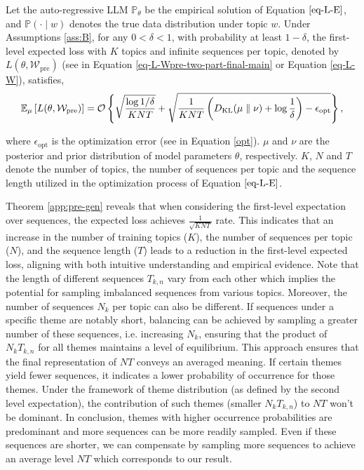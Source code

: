 \begin{theorem} Let the auto-regressive LLM $\mathbb{P}_\theta$ be the empirical solution of Equation $\ref{eq-L-E}$, and $\mathbb{P}(\cdot\mid w)$ denotes the true data distribution under topic $w$. Under Assumptions \ref{ass:B}, for any $0<\delta < 1$, with probability at least $1-\delta$, the first-level expected loss with $K$ topics and infinite sequences per topic, denoted by $L(\theta, \mathcal{W}_{\text{pre}})$ (see in Equation \ref{eq-L-Wpre-two-part-final-main} or Equation \ref{eq-L-W}), satisfies,
	\label{app:pre-gen}
    \begin{align*}
        \mathbb{E}_{\mu}\left[L(\theta, \mathcal{W}_{\text{pre}})\right]
        =\mathcal{O}\left\{\sqrt{\frac{\log 1/\delta}{KNT}}+\sqrt{\frac{1}{KNT}\left(D_{\mathrm{KL}}(\mu\parallel \nu)+\operatorname{log}\frac{1}{\delta}\right)-\epsilon_{\text{opt}}}\right\},
    \end{align*}

	where $\epsilon_{\text{opt}}$ is the optimization error (see in Equation \ref{opt}). $\mu$ and $\nu$ are the posterior and prior distribution of model parameters $\theta$, respectively. $K$, $N$ and $T$ denote the number of topics, the number of sequences per topic and the sequence length utilized in the optimization process of Equation $\ref{eq-L-E}$.
\end{theorem}

\begin{remark}\label{remark-app: the1}
	Theorem \ref{app:pre-gen} reveals that when considering the first-level expectation over sequences, the expected loss achieves $\frac{1}{\sqrt{KNT}}$ rate. This indicates that an increase in the number of training topics ($K$), the number of sequences per topic ($N$), and the sequence length ($T$) leads to a reduction in the first-level expected loss, aligning with both intuitive understanding and empirical evidence. Note that the length of different sequences $T_{k,n}$ vary from each other which implies the potential for sampling imbalanced sequences from various topics. Moreover, the number of sequences $N_k$ per topic can also be different. If sequences under a specific theme are notably short, balancing can be achieved by sampling a greater number of these sequences, i.e. increasing $N_k$, ensuring that the product of $N_kT_{k,n}$ for all themes maintains a level of equilibrium. This approach ensures that the final representation of $NT$ conveys an averaged meaning. If certain themes yield fewer sequences, it indicates a lower probability of occurrence for those themes. Under the framework of theme distribution (as defined by the second level expectation), the contribution of such themes (smaller $N_kT_{k,n}$) to $NT$ won't be dominant. In conclusion, themes with higher occurrence probabilities are predominant and more sequences can be more readily sampled. Even if these sequences are shorter, we can compensate by sampling more sequences to achieve an average level $NT$ which corresponds to our result.
\end{remark}

